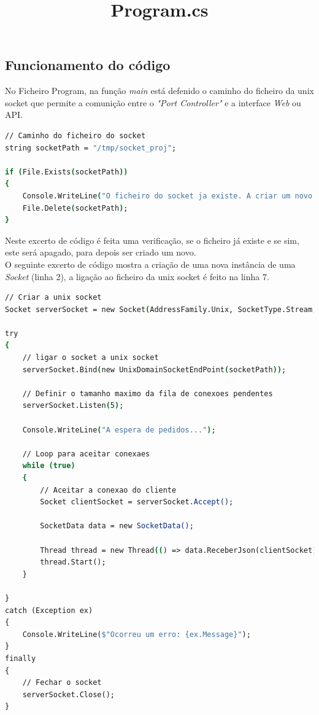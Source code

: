 \subsection{Funcionamento do código}

\title*{\textbf{Program.cs}}

No Ficheiro Program, na função \textit{main} está defenido o caminho do ficheiro 
da unix socket que permite a comunição entre o \textit{"Port Controller"} e 
a interface \textit{Web} ou API.


\begin{lstlisting}[language=csh, caption={verificação da existência da unix socket}]
// Caminho do ficheiro do socket
string socketPath = "/tmp/socket_proj";

if (File.Exists(socketPath))
{
    Console.WriteLine("O ficheiro do socket ja existe. A criar um novo...");
    File.Delete(socketPath);
}

\end{lstlisting}

Neste excerto de código é feita uma verificação, se o ficheiro já existe e se sim, este será apagado,
para depois ser criado um novo.\\



O seguinte excerto de código mostra a criação de uma nova instância de uma \textit{Socket}
(linha 2), a ligação ao ficheiro da unix socket é feito na linha 7.

\begin{lstlisting}[language=csh, caption={ligação do Port Controller à unix socket}]
// Criar a unix socket
Socket serverSocket = new Socket(AddressFamily.Unix, SocketType.Stream, ProtocolType.Unspecified);

try
{
    // ligar o socket a unix socket
    serverSocket.Bind(new UnixDomainSocketEndPoint(socketPath));

    // Definir o tamanho maximo da fila de conexoes pendentes
    serverSocket.Listen(5);

    Console.WriteLine("A espera de pedidos...");

    // Loop para aceitar conexaes
    while (true)
    {
        // Aceitar a conexao do cliente
        Socket clientSocket = serverSocket.Accept();

        SocketData data = new SocketData();

        Thread thread = new Thread(() => data.ReceberJson(clientSocket));
        thread.Start();
    }

}
catch (Exception ex)
{
    Console.WriteLine($"Ocorreu um erro: {ex.Message}");
}
finally
{
    // Fechar o socket
    serverSocket.Close();
}
\end{lstlisting}

